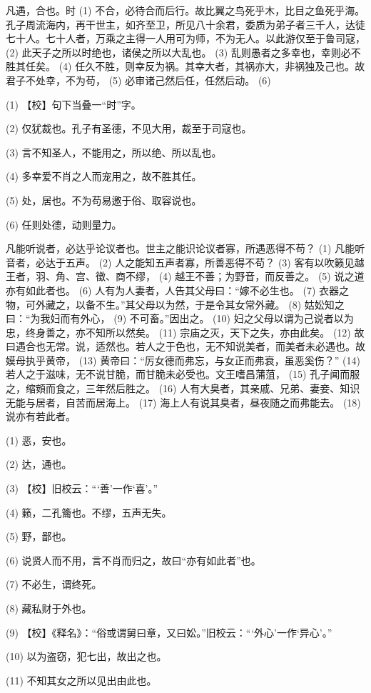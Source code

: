 \documentclass[12pt,UTF8]{ctexbook}
\begin{document}
凡遇，合也。时 (1) 不合，必待合而后行。故比翼之鸟死乎木，比目之鱼死乎海。孔子周流海内，再干世主，如齐至卫，所见八十余君，委质为弟子者三千人，达徒七十人。七十人者，万乘之主得一人用可为师，不为无人。以此游仅至于鲁司寇， (2) 此天子之所以时绝也，诸侯之所以大乱也。 (3) 乱则愚者之多幸也，幸则必不胜其任矣。 (4) 任久不胜，则幸反为祸。其幸大者，其祸亦大，非祸独及己也。故君子不处幸，不为苟， (5) 必审诸己然后任，任然后动。 (6)

(1) 【校】句下当叠一“时”字。

(2) 仅犹裁也。孔子有圣德，不见大用，裁至于司寇也。

(3) 言不知圣人，不能用之，所以绝、所以乱也。

(4) 多幸爱不肖之人而宠用之，故不胜其任。

(5) 处，居也。不为苟易邀于俗、取容说也。

(6) 任则处德，动则量力。

凡能听说者，必达乎论议者也。世主之能识论议者寡，所遇恶得不苟？ (1) 凡能听音者，必达于五声。 (2) 人之能知五声者寡，所善恶得不苟？ (3) 客有以吹籁见越王者，羽、角、宫、徵、商不缪， (4) 越王不善；为野音，而反善之。 (5) 说之道亦有如此者也。 (6) 人有为人妻者，人告其父母曰：“嫁不必生也。 (7) 衣器之物，可外藏之，以备不生。”其父母以为然，于是令其女常外藏。 (8) 姑妐知之曰：“为我妇而有外心， (9) 不可畜。”因出之。 (10) 妇之父母以谓为己说者以为忠，终身善之，亦不知所以然矣。 (11) 宗庙之灭，天下之失，亦由此矣。 (12) 故曰遇合也无常。说，适然也。若人之于色也，无不知说美者，而美者未必遇也。故嫫母执乎黄帝， (13) 黄帝曰：“厉女德而弗忘，与女正而弗衰，虽恶奚伤？” (14) 若人之于滋味，无不说甘脆，而甘脆未必受也。文王嗜昌蒲菹， (15) 孔子闻而服之，缩頞而食之，三年然后胜之。 (16) 人有大臭者，其亲戚、兄弟、妻妾、知识无能与居者，自苦而居海上。 (17) 海上人有说其臭者，昼夜随之而弗能去。 (18) 说亦有若此者。

(1) 恶，安也。

(2) 达，通也。

(3) 【校】旧校云：“‘善’一作‘喜’。”

(4) 籁，二孔籥也。不缪，五声无失。

(5) 野，鄙也。

(6) 说贤人而不用，言不肖而归之，故曰“亦有如此者”也。

(7) 不必生，谓终死。

(8) 藏私财于外也。

(9) 【校】《释名》：“俗或谓舅曰章，又曰妐。”旧校云：“‘外心’一作‘异心’。”

(10) 以为盗窃，犯七出，故出之也。

(11) 不知其女之所以见出由此也。
\end{document}
